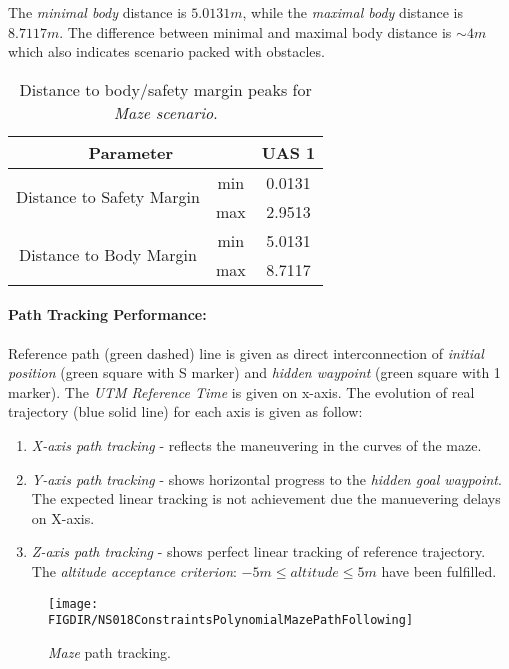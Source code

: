 The \emph{minimal body} distance is $5.0131 m$, while the \emph{maximal body} distance is $8.7117 m$. The difference between minimal and maximal body distance is $\sim 4 m$ which also indicates scenario packed with obstacles. 

\begin{table}[H]
    \centering
    \begin{tabular}{c|c||c}
    \multicolumn{2}{c||}{Parameter} & UAS 1 \\\hline\hline
    \multirow{2}{*}{Distance to Safety Margin} & min & 0.0131 \\\cline{2-3}
                                            & max & 2.9513 \\\hline
    \multirow{2}{*}{Distance to Body Margin}   & min & 5.0131 \\\cline{2-3}
                                            & max & 8.7117 
    \end{tabular}
    \caption{Distance to body/safety margin peaks for \emph{Maze scenario}.}
    \label{tab:testCaseMazeSafetyAndBodyMarginDistances}
\end{table}

\paragraph{Path Tracking Performance:} Reference path (green dashed) line is given as direct interconnection of \emph{initial position} (green square with S marker) and \emph{hidden waypoint} (green square with 1 marker). The \emph{UTM Reference Time} is given on x-axis. The evolution of real trajectory (blue solid line) for each axis is given as follow:

\begin{enumerate}
    \item \emph{X-axis path tracking} - reflects the maneuvering in the curves of the maze.
    
    \item \emph{Y-axis path tracking} - shows horizontal progress to the \emph{hidden goal waypoint}. The expected linear tracking is not achievement due the manuevering delays on X-axis.
    
    \item \emph{Z-axis path tracking} - shows perfect linear tracking of reference trajectory. The \emph{altitude acceptance criterion}: $-5m \le altitude \le 5m$ have been fulfilled.
\end{enumerate}

\begin{figure}[H]
    \centering
    \texttt{[image: \\FIGDIR/NS018ConstraintsPolynomialMazePathFollowing]} 
    \caption{\emph{Maze} path tracking.}
    \label{fig:testCaseMazePathTracking}
\end{figure}


